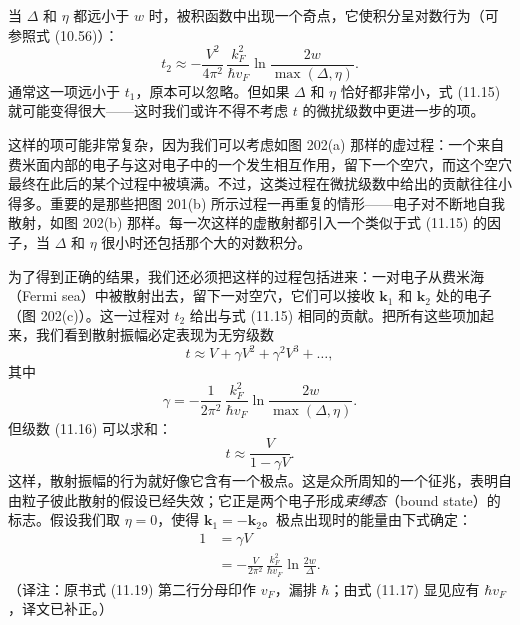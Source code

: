 
当 $\Delta$ 和 $\eta$ 都远小于 $w$ 时，被积函数中出现一个奇点，它使积分呈对数行为（可参照式 (10.56)）：
\begin{equation*}
t_{2}\approx-\frac{V^{2}}{4\pi^{2}}\,\frac{k_{F}^{2}}{\hbar v_{F}}\ln\frac{2w}{\max{(\Delta,\eta)}}.
\tag{11.15}
\end{equation*}
通常这一项远小于 $t_1$，原本可以忽略。但如果 $\Delta$ 和 $\eta$ 恰好都非常小，式 (11.15) 就可能变得很大——这时我们或许不得不考虑 $t$ 的微扰级数中更进一步的项。

这样的项可能非常复杂，因为我们可以考虑如图 202(a) 那样的虚过程：一个来自费米面内部的电子与这对电子中的一个发生相互作用，留下一个空穴，而这个空穴最终在此后的某个过程中被填满。不过，这类过程在微扰级数中给出的贡献往往小得多。重要的是那些把图 201(b) 所示过程一再重复的情形——电子对不断地自我散射，如图 202(b) 那样。每一次这样的虚散射都引入一个类似于式 (11.15) 的因子，当 $\Delta$ 和 $\eta$ 很小时还包括那个大的对数积分。

为了得到正确的结果，我们还必须把这样的过程包括进来：一对电子从费米海（Fermi sea）中被散射出去，留下一对空穴，它们可以接收 $\mathbf{k}_1$ 和 $\mathbf{k}_2$ 处的电子（图 202(c)）。这一过程对 $t_2$ 给出与式 (11.15) 相同的贡献。把所有这些项加起来，我们看到散射振幅必定表现为无穷级数
\begin{equation*}
t\approx V+\gamma V^{2}+\gamma^{2}V^{3}+\ldots,
\tag{11.16}
\end{equation*}
其中
\begin{equation*}
\gamma=-\frac{1}{2\pi^{2}}\,\frac{k_{F}^{2}}{\hbar v_{F}}\ln\frac{2w}{\max{(\Delta,\eta)}}.
\tag{11.17}
\end{equation*}
但级数 (11.16) 可以求和：
\begin{equation*}
t\approx\frac{V}{1-\gamma V}.
\tag{11.18}
\end{equation*}
这样，散射振幅的行为就好像它含有一个极点。这是众所周知的一个征兆，表明自由粒子彼此散射的假设已经失效；它正是两个电子形成\emph{束缚态}（bound state）的标志。假设我们取 $\eta=0$，使得 $\mathbf{k}_1=-\mathbf{k}_2$。极点出现时的能量由下式确定：
\begin{align*}
1&=\gamma V\\
&=-\frac{V}{2\pi^{2}}\,\frac{k_{F}^{2}}{\hbar v_{F}}\ln\frac{2w}{\Delta}.
\tag{11.19}
\end{align*}
（译注：原书式 (11.19) 第二行分母印作 $v_F$，漏排 $\hbar$；由式 (11.17) 显见应有 $\hbar v_F$，译文已补正。）

